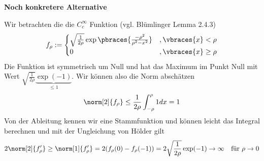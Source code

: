\begin{solution}

\textbf{Noch konkretere Alternative}

Wir betrachten die die $C_c^\infty$ Funktion (vgl. Blümlinger Lemma 2.4.3)
\begin{align*}
  f_\rho :=
  \begin{cases}
    \sqrt{\frac{1}{2\rho}}\exp\pbraces{\frac{- \rho^2}{\rho^2 - x^2}} &, \vbraces{x} < \rho \\
    0 &, \vbraces{x} \geq \rho
  \end{cases}
\end{align*}
Die Funktion ist symmetrisch um Null und hat das Maximum im Punkt Null mit Wert $\sqrt{\frac{1}{2\rho}} \underbrace{\exp(-1)}_{\leq 1}$. Wir können also die Norm abschätzen
\begin{align*}
  \norm[2]{f_\rho} \leq \frac{1}{2\rho} \int_{-\rho}^\rho 1 dx = 1
\end{align*}
Von der Ableitung kennen wir eine Stammfunktion und können leicht das Integral berechnen und mit der Ungleichung von Hölder gilt
\begin{align*}
  2\norm[2]{f_\rho^\prime} \geq \norm[1]{f_\rho^\prime} = 2(f_\rho(0) - f_\rho(-1)) = 2 \sqrt\frac{1}{2\rho} \exp(-1) \to \infty \quad \textrm{für $\rho \to 0$}
\end{align*}

\end{solution}
